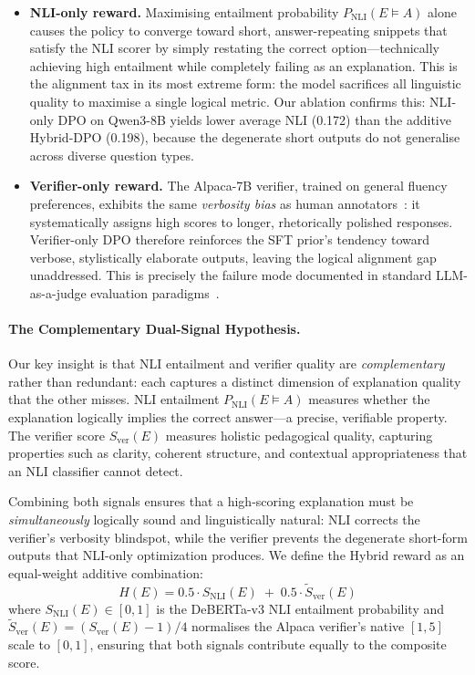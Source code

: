 \begin{itemize}
    \item \textbf{NLI-only reward.} Maximising entailment probability $P_\text{NLI}(E \models A)$ alone causes the policy to converge toward short, answer-repeating snippets that satisfy the NLI scorer by simply restating the correct option---technically achieving high entailment while completely failing as an explanation. This is the alignment tax in its most extreme form: the model sacrifices all linguistic quality to maximise a single logical metric. Our ablation confirms this: NLI-only DPO on Qwen3-8B yields lower average NLI (0.172) than the additive Hybrid-DPO (0.198), because the degenerate short outputs do not generalise across diverse question types.
    \item \textbf{Verifier-only reward.} The Alpaca-7B verifier, trained on general fluency preferences, exhibits the same \textit{verbosity bias} as human annotators~\cite{zheng2024judging}: it systematically assigns high scores to longer, rhetorically polished responses. Verifier-only DPO therefore reinforces the SFT prior's tendency toward verbose, stylistically elaborate outputs, leaving the logical alignment gap unaddressed. This is precisely the failure mode documented in standard LLM-as-a-judge evaluation paradigms~\cite{wang2023large, pan2024evalbias}.
\end{itemize}

\paragraph{The Complementary Dual-Signal Hypothesis.}
Our key insight is that NLI entailment and verifier quality are \textit{complementary} rather than redundant: each captures a distinct dimension of explanation quality that the other misses.
NLI entailment $P_\text{NLI}(E \models A)$ measures whether the explanation logically implies the correct answer---a precise, verifiable property.
The verifier score $S_\text{ver}(E)$ measures holistic pedagogical quality, capturing properties such as clarity, coherent structure, and contextual appropriateness that an NLI classifier cannot detect.

Combining both signals ensures that a high-scoring explanation must be \textit{simultaneously} logically sound and linguistically natural: NLI corrects the verifier's verbosity blindspot, while the verifier prevents the degenerate short-form outputs that NLI-only optimization produces. We define the Hybrid reward as an equal-weight additive combination:
\begin{equation}
H(E) = 0.5 \cdot S_\text{NLI}(E) \;+\; 0.5 \cdot \tilde{S}_\text{ver}(E)
\label{eq:hybrid_reward}
\end{equation}
where $S_\text{NLI}(E) \in [0,1]$ is the DeBERTa-v3 NLI entailment probability and $\tilde{S}_\text{ver}(E) = (S_\text{ver}(E) - 1)/4$ normalises the Alpaca verifier's native $[1,5]$ scale to $[0,1]$, ensuring that both signals contribute equally to the composite score.

